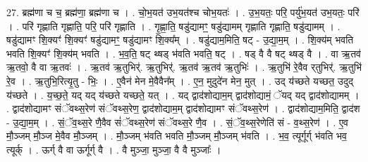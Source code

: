 \documentclass[17pt]{extarticle}
\begin{document}
27. ब्रह्म॑णा च च॒ ब्रह्म॑णा॒ ब्रह्म॑णा च । . चो॒भ॒यत॑ उभ॒यत॑श्च चोभ॒यतः॑ । . उ॒भ॒यतः॒ परि॒ पर्यु॑भ॒यत॑ उभ॒यतः॒ परि॑ । . परि॑ गृह्णाति गृह्णाति॒ परि॒ परि॑ गृह्णाति । . गृ॒ह्णा॒ति॒ षडु॑द्यामꣳ॒॒ षडु॑द्यामम् गृह्णाति गृह्णाति॒ षडु॑द्यामम् । . षडु॑द्यामꣳ शि॒क्यꣳ॑ शि॒क्यꣳ॑ षडु॑द्यामꣳ॒॒ षडु॑द्यामꣳ शि॒क्य᳚म् । . षडु॑द्याम॒मिति॒ षट् - उ॒द्या॒म॒म् । . शि॒क्य॑म् भवति भवति शि॒क्यꣳ॑ शि॒क्य॑म् भवति । . भ॒व॒ति॒ षट् थ्षड् भ॑वति भवति॒ षट् । . षड् वै वै षट् थ्षड् वै । . वा ऋ॒तव॑ ऋ॒तवो॒ वै वा ऋ॒तवः॑ । . ऋ॒तव॑ ऋ॒तुभिर्॑. ऋ॒तुभिर्॑. ऋ॒तव॑ ऋ॒तव॑ ऋ॒तुभिः॑ । . ऋ॒तुभि॑ रे॒वैव र्‌तुभिर्॑. ऋ॒तुभि॑ रे॒व । . ऋ॒तुभि॒रित्यृ॒तु - भिः॒ । . ए॒वैन॑ मेन मे॒वैवैन᳚म् । . ए॒न॒ मुदुदे॑न मेन॒ मुत् । . उद् य॑च्छते यच्छत॒ उदुद् य॑च्छते । . य॒च्छ॒ते॒ यद् यद् य॑च्छते यच्छते॒ यत् । . यद् द्वाद॑शोद्याम॒म् द्वाद॑शोद्यामं॒ ॅयद् यद् द्वाद॑शोद्यामम् । . द्वाद॑शोद्यामꣳ संॅवथ्स॒रेण॑ संॅवथ्स॒रेण॒ द्वाद॑शोद्याम॒म् द्वाद॑शोद्यामꣳ संॅवथ्स॒रेण॑ । . द्वाद॑शोद्याम॒मिति॒ द्वाद॑श - उ॒द्या॒म॒म् । . सं॒ॅव॒थ्स॒रे णै॒वैव सं॑ॅवथ्स॒रेण॑ संॅवथ्स॒रे णै॒व । . सं॒ॅव॒थ्स॒रेणेति॑ सं - व॒थ्स॒रेण॑ । . ए॒व मौ॒ञ्जम् मौ॒ञ्ज मे॒वैव मौ॒ञ्जम् । . मौ॒ञ्जम् भ॑वति भवति मौ॒ञ्जम् मौ॒ञ्जम् भ॑वति । . भ॒व॒ त्यूर्गूर्ग् भ॑वति भव॒ त्यूर्क् । . ऊर्ग् वै वा ऊर्गूर्ग् वै । . वै मुञ्जा॒ मुञ्जा॒ वै वै मुञ्जाः᳚ । \newline
\end{document}
